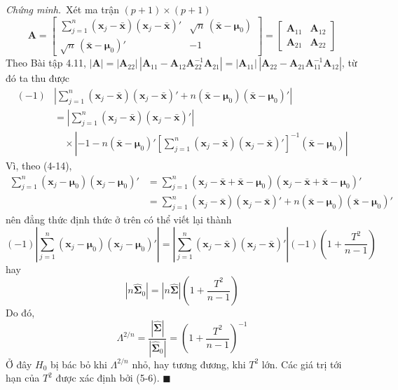 \par\noindent\textit{Chứng minh.}\ 
Xét ma trận $(p+1)\times(p+1)$
\[
\mathbf{A} =
\begin{bmatrix}
\sum\limits_{j=1}^{n}(\mathbf{x}_j-\bar{\mathbf{x}})(\mathbf{x}_j-\bar{\mathbf{x}})' & \sqrt{n}\,(\bar{\mathbf{x}}-\boldsymbol{\mu}_0)\\[6pt]
\sqrt{n}\,(\bar{\mathbf{x}}-\boldsymbol{\mu}_0)' & -1
\end{bmatrix}
=
\begin{bmatrix}
\mathbf{A}_{11} & \mathbf{A}_{12}\\
\mathbf{A}_{21} & \mathbf{A}_{22}
\end{bmatrix}
\]
Theo Bài tập 4.11, $|\mathbf{A}| = |\mathbf{A}_{22}|\,|\mathbf{A}_{11}-\mathbf{A}_{12}\mathbf{A}_{22}^{-1}\mathbf{A}_{21}| = |\mathbf{A}_{11}|\,|\mathbf{A}_{22}-\mathbf{A}_{21}\mathbf{A}_{11}^{-1}\mathbf{A}_{12}|$, từ đó ta thu được
\begin{align*}
(-1)&\left|\sum_{j=1}^{n}(\mathbf{x}_j-\bar{\mathbf{x}})(\mathbf{x}_j-\bar{\mathbf{x}})' + n(\bar{\mathbf{x}}-\boldsymbol{\mu}_0)(\bar{\mathbf{x}}-\boldsymbol{\mu}_0)'\right| \\
&= \left|\sum_{j=1}^{n}(\mathbf{x}_j-\bar{\mathbf{x}})(\mathbf{x}_j-\bar{\mathbf{x}})'\right| \\
&\quad {}\times
\left|-1-n(\bar{\mathbf{x}}-\boldsymbol{\mu}_0)'\left[\sum_{j=1}^{n}(\mathbf{x}_j-\bar{\mathbf{x}})(\mathbf{x}_j-\bar{\mathbf{x}})'\right]^{-1}(\bar{\mathbf{x}}-\boldsymbol{\mu}_0)\right|
\end{align*}
Vì, theo (4-14),
\begin{align*}
\sum_{j=1}^{n}(\mathbf{x}_j-\boldsymbol{\mu}_0)(\mathbf{x}_j-\boldsymbol{\mu}_0)'
&= \sum_{j=1}^{n}(\mathbf{x}_j-\bar{\mathbf{x}}+\bar{\mathbf{x}}-\boldsymbol{\mu}_0)(\mathbf{x}_j-\bar{\mathbf{x}}+\bar{\mathbf{x}}-\boldsymbol{\mu}_0)' \\
&= \sum_{j=1}^{n}(\mathbf{x}_j-\bar{\mathbf{x}})(\mathbf{x}_j-\bar{\mathbf{x}})' + n(\bar{\mathbf{x}}-\boldsymbol{\mu}_0)(\bar{\mathbf{x}}-\boldsymbol{\mu}_0)'
\end{align*}
nên đẳng thức định thức ở trên có thể viết lại thành
\[
(-1)\left|\sum_{j=1}^{n}(\mathbf{x}_j-\boldsymbol{\mu}_0)(\mathbf{x}_j-\boldsymbol{\mu}_0)'\right|
= \left|\sum_{j=1}^{n}(\mathbf{x}_j-\bar{\mathbf{x}})(\mathbf{x}_j-\bar{\mathbf{x}})'\right|(-1)\left(1+\frac{T^2}{n-1}\right)
\]
hay
\[
|n\hat{\boldsymbol{\Sigma}}_0| = |n\hat{\boldsymbol{\Sigma}}|\left(1+\frac{T^2}{n-1}\right)
\]
Do đó,
\begin{equation}
\Lambda^{2/n} = \frac{|\hat{\boldsymbol{\Sigma}}|}{|\hat{\boldsymbol{\Sigma}}_0|} = \left(1+\frac{T^2}{n-1}\right)^{-1}
\tag{5-14}
\end{equation}
Ở đây $H_0$ bị bác bỏ khi $\Lambda^{2/n}$ nhỏ, hay tương đương, khi $T^2$ lớn. Các giá trị tới hạn của $T^2$ được xác định bởi (5-6). \hfill$\blacksquare$\par\medskip

